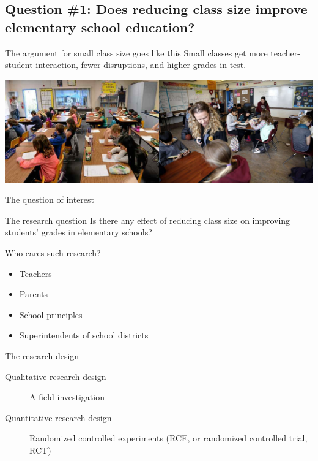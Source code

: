 \documentclass[presentation]{beamer}
\begin{document}
\subsection*{Question \#1: Does reducing class size improve elementary school education?}
\label{sec:org1e8afd0}

\begin{frame}[label={sec:org2cb2b50}]{The argument for small class size goes like this}
Small classes get more teacher-student interaction, fewer disruptions,
and higher grades in test. 

\begin{center}
\includegraphics[width=.9\linewidth]{figure/calclassroom_cmp.png}
\end{center}
\end{frame}

\begin{frame}[label={sec:org655792a}]{The question of interest}
\begin{block}{The research question}
Is there any effect of reducing class size on improving students' grades in
elementary schools?
\end{block}

\begin{block}{Who cares such research?}
\begin{itemize}
\item Teachers
\item Parents
\item School principles
\item Superintendents of school districts
\end{itemize}
\end{block}
\end{frame}

\begin{frame}[label={sec:org3cc5c2a}]{The research design}
\begin{description}
\item[{Qualitative research design}] A field investigation

\item[{Quantitative research design}] Randomized controlled experiments
(RCE, or randomized controlled trial, RCT)
\end{description}
\end{frame}
\end{document}
